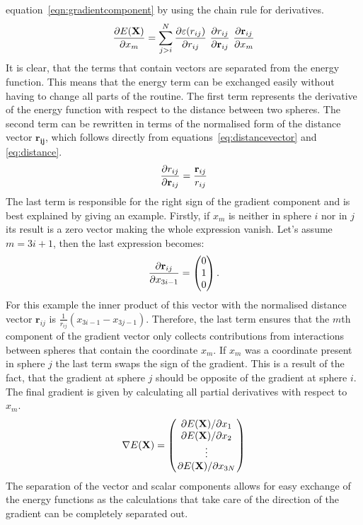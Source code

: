 equation~\eqref{eqn:gradientcomponent} by using the chain rule for derivatives.
%
\begin{align}
    \pdv{E(\mathbf{X})}{x_m}=\sum_{j>i}^N\pdv{\varepsilon(r_{ij})}{r_{ij}}\ \pdv{r_{ij}}{\mathbf{r}_{ij}}\ \pdv{\mathbf{r}_{ij}}{x_m}\label{eqn:gradientcomponent}
\end{align}%
%
It is clear, that the terms that contain vectors are separated from the energy
function. This means that the energy term can be exchanged easily without
having to change all parts of the routine. The first term represents the
derivative of the energy function with respect to the distance between two
spheres. The second term can be rewritten in terms of the normalised form of
the distance vector $\mathbf{r_{ij}}$, which follows directly from
equations~\eqref{eq:distancevector} and \eqref{eq:distance}.
%
\begin{align}
    \pdv{r_{ij}}{\mathbf{r}_{ij}}=\frac{\mathbf{r}_{ij}}{r_{ij}}
\end{align}%
%
The last term is responsible for the right sign of the gradient component and
is best explained by giving an example. Firstly, if $x_m$ is neither in sphere
$i$ nor in $j$ its result is a zero vector making the whole expression vanish.
Let's assume $m=3i+1$, then the last expression becomes:
%
\begin{align}
    \pdv{\mathbf{r}_{ij}}{x_{3i-1}}=
    \begin{pmatrix}
        0\\1\\0
    \end{pmatrix}.
\end{align}%
%
For this example the inner product of this vector with the normalised distance
vector $\mathbf{r}_{ij}$ is $\frac{1}{r_{ij}}(x_{3i-1} - x_{3j-1})$. Therefore,
the last term ensures that the $m$th component of the gradient vector only
collects contributions from interactions between spheres that contain the
coordinate $x_m$. If $x_m$ was a coordinate present in sphere $j$ the last term
swaps the sign of the gradient. This is a result of the fact, that the gradient
at sphere $j$ should be opposite of the gradient at sphere $i$. The final
gradient is given by calculating all partial derivatives with respect to $x_m$.
%
\begin{align}
    \nabla E(\mathbf{X})=
    \begin{pmatrix}
        \pdv*{E(\mathbf{X})}{x_1}\\
        \pdv*{E(\mathbf{X})}{x_2}\\
        \vdots\\
        \pdv*{E(\mathbf{X})}{x_{3N}}
    \end{pmatrix}
\end{align}
%
The separation of the vector and scalar components allows for easy exchange of
the energy functions as the calculations that take care of the direction of the
gradient can be completely separated out. 

